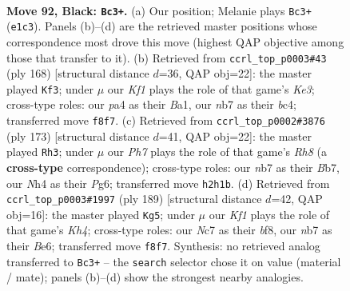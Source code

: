 \documentclass[11pt]{article}
\begin{document}
\clearpage

\begin{figure}[p]\centering
\begin{subfigure}{0.46\textwidth}\centering
\resizebox{\linewidth}{!}{%
\newchessgame
\chessboard[
  setfen={5k2/1Nn5/8/p7/P2pP2n/1P1B4/1K2P2p/4b3 b - - 1 92},
  showmover=false,
  pgfstyle=straightmove, color=movearrow, markmove={e1-c3}
]}
\caption{}
\end{subfigure}\hfill
\begin{subfigure}{0.46\textwidth}\centering
\resizebox{\linewidth}{!}{%
\newchessgame
\chessboard[
  setfen={6k1/1B3p2/Pb4p1/2p1P2p/2b4P/4K1P1/8/B7 w - - 45 85},
  showmover=false,
  pgfstyle=straightmove, color=movearrow, markmove={e3-f3}
]}
\caption{}
\end{subfigure}
\\[4pt]
\begin{subfigure}{0.46\textwidth}\centering
\resizebox{\linewidth}{!}{%
\newchessgame
\chessboard[
  setfen={3k4/1b6/p5p1/P2P1pP1/1PP2B2/8/3KB3/7r b - - 18 87},
  showmover=false,
  pgfstyle=straightmove, color=movearrow, markmove={h1-h3}
]}
\caption{}
\end{subfigure}\hfill
\begin{subfigure}{0.46\textwidth}\centering
\resizebox{\linewidth}{!}{%
\newchessgame
\chessboard[
  setfen={5B2/8/4b3/1p5k/1P3p1p/5P1P/1P4P1/6K1 b - - 61 95},
  showmover=false,
  pgfstyle=straightmove, color=movearrow, markmove={h5-g5}
]}
\caption{}
\end{subfigure}
\caption{\textbf{Move 92, Black: \texttt{Bc3+}.} (a) Our position; Melanie plays \texttt{Bc3+} (\texttt{e1c3}). Panels (b)--(d) are the retrieved master positions whose correspondence most drove this move (highest QAP objective among those that transfer to it). (b) Retrieved from \texttt{ccrl\_top\_p0003\#43} (ply 168) [structural distance $d$=36, QAP obj=22]: the master played \texttt{Kf3}; under $\mu$ our \emph{Kf1} plays the role of that game's \emph{Ke3}; cross-type roles: our \emph{p}a4 as their \emph{B}a1, our \emph{n}b7 as their \emph{b}c4; transferred move \texttt{f8f7}. (c) Retrieved from \texttt{ccrl\_top\_p0002\#3876} (ply 173) [structural distance $d$=41, QAP obj=22]: the master played \texttt{Rh3}; under $\mu$ our \emph{Ph7} plays the role of that game's \emph{Rh8} (a \textbf{cross-type} correspondence); cross-type roles: our \emph{n}b7 as their \emph{B}b7, our \emph{N}h4 as their \emph{P}g6; transferred move \texttt{h2h1b}. (d) Retrieved from \texttt{ccrl\_top\_p0003\#1997} (ply 189) [structural distance $d$=42, QAP obj=16]: the master played \texttt{Kg5}; under $\mu$ our \emph{Kf1} plays the role of that game's \emph{Kh4}; cross-type roles: our \emph{N}c7 as their \emph{b}f8, our \emph{n}b7 as their \emph{B}e6; transferred move \texttt{f8f7}. Synthesis: no retrieved analog transferred to \texttt{Bc3+} -- the \texttt{search} selector chose it on value (material / mate); panels (b)--(d) show the strongest nearby analogies.}
\label{fig:thought-m183}
\end{figure}
\end{document}
